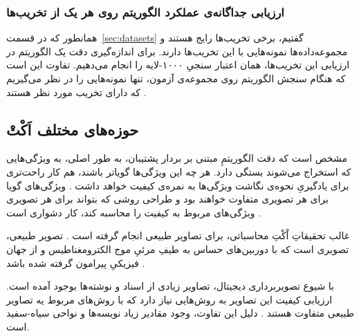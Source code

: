 \documentclass[twocolumn]{article}
\begin{document}
\subsubsection{ارزیابی جداگانه‌ی عملکرد الگوریتم روی هر یک از تخریب‌ها} \label{sec:perdist}
همانطور که در قسمت~\ref{sec:datasets} گفتیم، برخی تخریب‌ها رایج هستند و مجموعه‌داده‌ها نمونه‌هایی با این تخریب‌ها دارند. برای اندازه‌گیری دقت یک الگوریتم در ارزیابی این تخریب‌ها، همان اعتبار سنجیِ ۱۰۰۰-لایه را انجام می‌دهیم. تفاوت این است که هنگام سنجش الگوریتم روی مجموعه‌ی آزمون، تنها نمونه‌هایی را در نظر می‌گیریم که دارای تخریب مورد نظر هستند \cite{xue2014blind}.
\subsection{حوزه‌های مختلف اَکْتْ} \label{sec:domains}
مشخص است که دقت الگوریتمِ مبتنی بر بردار پشتیبان، به طور اصلی، به ویژگی‌هایی که استخراج می‌شوند بستگی دارد. هر چه این ویژگی‌ها گویاتر باشند،  هم کار راحت‌تری برای یادگیریِ نحوه‌ی نگاشت ویژگی‌ها به نمره‌ی کیفیت خواهد داشت \cite{chandler2013seven}. ویژگی‌های گویا برای هر تصویری متفاوت خواهند بود و طراحی روشی که بتواند برای هر تصویری ویژگی‌های مربوط به کیفیت را محاسبه کند، کار دشواری است \cite{kang2014convolutional}.

غالب تحقیقاتِ اْکْتِ محاسباتی، برای تصاویر طبیعی انجام گرفته است \cite{yang2015perceptual}. تصویر طبیعی، تصویری است که با دوربین‌های حساس به طیفِ مرئیِ موج الکترومغناطیس و از جهان فیزیکیِ پیرامون گرفته شده باشد \cite{mittal2013natural}. 

با شیوع تصویربرداری دیجیتال، تصاویر زیادی از اسناد و نوشته‌ها بوجود آمده است. ارزیابی کیفیت این تصاویر به روش‌هایی نیاز دارد که با روش‌های مربوط یه تصاویر طبیعی متفاوت هستند \cite{ye2013document}. دلیل این تفاوت، وجود مقادیر زیاد نویسه‌ها و نواحی سیاه-سفید است.
\end{document}
